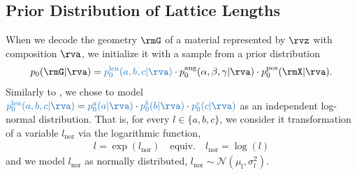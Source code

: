\documentclass{article}
\theoremstyle{plain}
\theoremstyle{definition}
\theoremstyle{remark}
\begin{document}
\subsection{Prior Distribution of Lattice Lengths}
\label{app:prior}
When we decode the geometry $\rmG$ of a material represented by $\rvz$ with composition $\rva$, we initialize it with a sample from a prior distribution 
\begin{align}
    \label{eq:prior-rewrite}
    p_{0}(\rmG|\rva)={\color{RoyalBlue}p^{\text{len}}_{0}(a,b,c|\rva)}\cdot p^{\text{ang}}_{0}(\alpha, \beta, \gamma|\rva)\cdot p^{\text{pos}}_{0}(\rmX|\rva).
\end{align}
Similarly to \citet{miller2024flowmm}, we chose to model ${\color{RoyalBlue}p^{\text{len}}_{0}(a,b,c|\rva)}={\color{RoyalBlue}p^{a}_{0}(a|\rva)} \cdot 
{\color{RoyalBlue}p^{b}_{0}(b|\rva)} \cdot 
{\color{RoyalBlue}p^{c}_{0}(c|\rva)}$ 
as an independent log-normal distribution.
That is, for every $l\in\{a, b, c\}$, we consider it transformation of a variable $l_{\text{nor}}$ via the logarithmic function,
\begin{align}
    \label{eq:logit-normal}
    l = \exp(l_{\text{nor}}) \quad \text{equiv.} \quad l_{\text{nor}} = \log(l) 
\end{align}
and we model $l_{\text{nor}}$ as normally distributed, $l_{\text{nor}}\sim \mathcal{N}(\mu_{\text{l}}, \sigma^{2}_{l})$.
\end{document}
